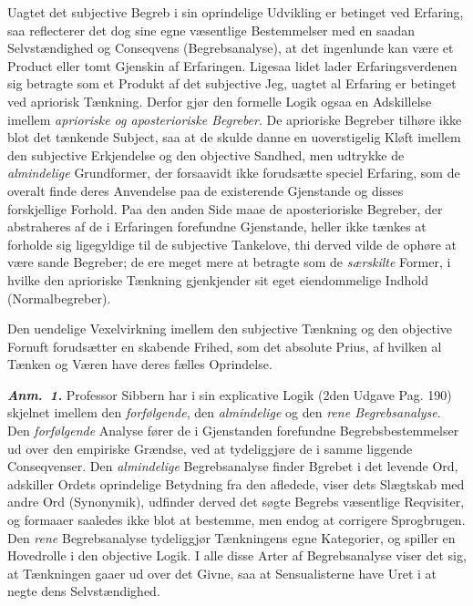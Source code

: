 \documentclass[12pt]{book}
\newcommand{\anm}[1]{\emph{\textbf{Anm.~#1.}}}
\newcommand{\opage}[1]{\marginnote{\footnotesize\textit{[#1]}}}
\begin{document}
Uagtet det subjective Begreb i sin oprindelige Udvikling er betinget ved
Erfaring, saa reflecterer det dog sine egne væsentlige Bestemmelser med en
saadan Selvstændighed og Conseqvens (Begrebsanalyse), at det ingenlunde kan
være et Product eller tomt Gjenskin af Erfaringen. Ligesaa lidet lader
Erfaringsverdenen sig betragte som et Produkt af det subjective Jeg, uagtet al
Erfaring er betinget ved apriorisk Tænkning. Derfor gjør den formelle Logik
ogsaa en Adskillelse imellem \emph{aprioriske og aposterioriske Begreber}. De
aprioriske Begreber tilhøre ikke blot det tænkende Subject, saa at de skulde
danne en uoverstigelig Kløft imellem den subjective Erkjendelse og den
objective Sandhed, men udtrykke de \emph{almindelige} Grundformer, der
forsaavidt ikke forudsætte speciel Erfaring, som de overalt finde deres
Anvendelse paa de
\opage{21} existerende Gjenstande og disses forskjellige Forhold. Paa den anden Side maae
de aposterioriske Begreber, der abstraheres af de i Erfaringen forefundne
Gjenstande, heller ikke tænkes at forholde sig ligegyldige til de subjective
Tankelove, thi derved vilde de ophøre at være sande Begreber; de ere meget
mere at betragte som de \emph{særskilte} Former, i hvilke den aprioriske
Tænkning gjenkjender sit eget eiendommelige Indhold (Normalbegreber).

Den uendelige Vexelvirkning imellem den subjective Tænkning og den objective
Fornuft forudsætter en skabende Frihed, som det absolute Prius, af hvilken al
Tænken og Væren have deres fælles Oprindelse.

\anm{1} Professor Sibbern har i sin explicative Logik (2den Udgave Pag.
190) skjelnet imellem den \emph{forfølgende}, den \emph{almindelige}
og den \emph{rene Begrebsanalyse}. Den \emph{forfølgende} Analyse fører de i
Gjenstanden forefundne Begrebsbestemmelser ud over den empiriske Grændse, ved
at tydeliggjøre de i samme liggende Conseqvenser. Den \emph{almindelige}
Begrebsanalyse finder Bgrebet i det levende Ord, adskiller Ordets oprindelige
Betydning fra den afledede, viser dets Slægtskab med andre Ord (Synonymik),
udfinder derved det søgte Begrebs væsentlige Reqvisiter, og formaaer saaledes
ikke blot at bestemme, men endog at corrigere Sprogbrugen. Den \emph{rene}
Begrebsanalyse tydeliggjør Tænkningens egne Kategorier, og spiller en
Hovedrolle i den objective Logik. I alle disse Arter af Begrebsanalyse viser
det sig, at Tænkningen gaaer ud over det Givne, saa at Sensualisterne have
Uret i at negte dens Selvstændighed.
\end{document}
